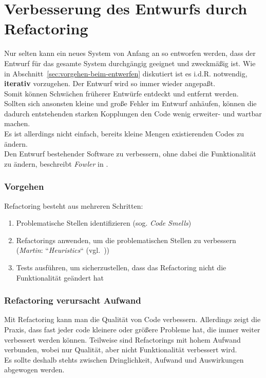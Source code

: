 \section{Verbesserung des Entwurfs durch Refactoring}
Nur selten kann ein neues System von Anfang an so entworfen werden, dass der Entwurf für das gesamte System  durchgängig geeignet und zweckmäßig ist.
Wie in Abschnitt~\ref{sec:vorgehen-beim-entwerfen} diskutiert ist es i.d.R. notwendig, \textbf{iterativ} vorzugehen.
Der Entwurf wird so immer wieder angepaßt.\\
Somit können Schwächen früherer Entwürfe entdeckt und entfernt werden.\\
Sollten sich ansonsten kleine und große Fehler im Entwurf anhäufen, können die dadurch entstehenden starken Kopplungen den Code wenig erweiter- und wartbar machen.\\

\noindent
Es ist allerdings nicht einfach, bereits kleine Mengen existierenden Codes zu ändern.\\
Den Entwurf bestehender Software zu verbessern, ohne dabei die Funktionalität zu ändern, beschreibt \textit{Fowler} in \cite{Fow99}.

\subsubsection*{Vorgehen}
Refactoring besteht aus mehreren Schritten:

\begin{enumerate}
    \item Problematische Stellen identifizieren (sog. \textit{Code Smells})
    \item Refactorings anwenden, um die problematischen Stellen zu verbessern (\textit{Martin}: ``\textit{Heuristics}`` (vgl.~\cite[285 ff.]{Mar08}))
    \item Tests ausführen, um sicherzustellen, dass das Refactoring nicht die Funktionalität geändert hat
\end{enumerate}

\subsubsection*{Refactoring verursacht Aufwand}
Mit Refactoring kann man die Qualität von Code verbessern.
Allerdings zeigt die Praxis, dass fast jeder code kleinere oder größere Probleme hat, die immer weiter verbessert werden können.
Teilweise sind Refactorings mit hohem Aufwand verbunden, wobei nur Qualität, aber nicht Funktionalität verbessert wird.\\
Es sollte deshalb stehts zwischen Dringlichkeit, Aufwand und Auswirkungen abgewogen werden.